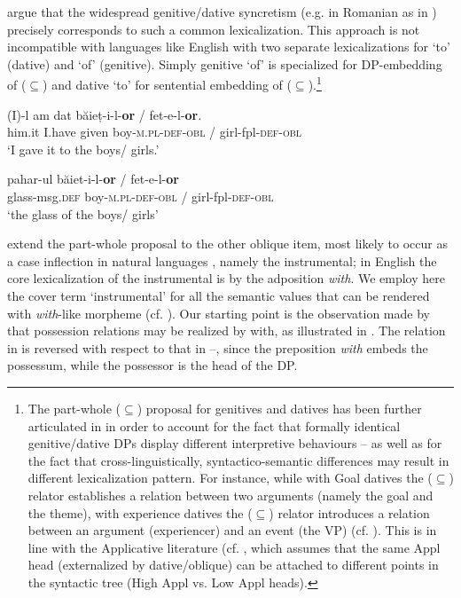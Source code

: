 \documentclass[output=paper,modfonts,nonflat,newtxmath,colorlinks,citecolor=brown]{langsci/langscibook}
\begin{document}
\citet{ManziniSavoia2011} argue that the widespread genitive/dative syncretism (e.g. in Romanian as in ) precisely corresponds to such a common lexicalization. This approach is not incompatible with languages like English with two separate lexicalizations for ‘to’ (dative) and ‘of’ (genitive). Simply genitive ‘of’ is specialized for DP-embedding of (${\subseteq}$) and dative ‘to’ for sentential embedding of (${\subseteq}$).\footnote{The part-whole (\textrm{${\subseteq}$}) proposal for genitives and datives has been further articulated in \citet{ManziniFranco2016, FrancoManzini2017Gen} in order to account for the fact that formally identical genitive/dative DPs display different interpretive behaviours – as well as for the fact that cross-linguistically, syntactico-semantic differences may result in different lexicalization pattern. For instance, while with Goal datives the (\textrm{${\subseteq}$}) relator establishes a relation between two arguments (namely the goal and the theme), with experience datives the (\textrm{${\subseteq}$}) relator introduces a relation between an argument (experiencer) and an event (the VP) (cf. \citealt[230--231]{ManziniFranco2016}). This is in line with the Applicative literature (cf. \citealt{Pylkkänen2008}, which assumes that the same Appl head (externalized by dative/oblique) can be attached to different points in the syntactic tree (High Appl {vs}. Low Appl heads).}

\ea%
    \label{ex:franco:3}
    \ea
    \gll (I)-l am dat băieț-i-l-\textbf{or} / fet-e-l-\textbf{or}. \\
        him.it I.have given boy-\textsc{m.pl}-\textsc{def}-\textsc{obl} / girl-fpl-\textsc{def}-\textsc{obl}\\
    \glt ‘I gave it to the boys/ girls.’

     \ex
    \gll pahar-ul băiet-i-l-\textbf{or} / fet-e-l-\textbf{or} \\
        glass-msg.\textsc{def} boy-\textsc{m.pl}-\textsc{def}-\textsc{obl} / girl-fpl-\textsc{def}-\textsc{obl}\\
    \glt ‘the glass of the boys/ girls’
    \z
    \z


\citet{FrancoManzini2017Ins} extend the part-whole proposal to the other oblique item, most likely to occur as a case inflection in natural languages \citep{Caha2009}, namely the instrumental; in English the core lexicalization of the instrumental is by the adposition \textit{with}. We employ here the cover term ‘instrumental’ for all the semantic values that can be rendered with \textit{with}-like morpheme (cf. \citealt{StolzStrohUrdze2006}). Our starting point is the observation made by \citet{Levinson2011} that possession relations may be realized by {with}, as illustrated in . The relation in  is reversed with respect to that in --, since the preposition \textit{with} embeds the {possessum}, while the possessor is the head of the DP.
\end{document}
